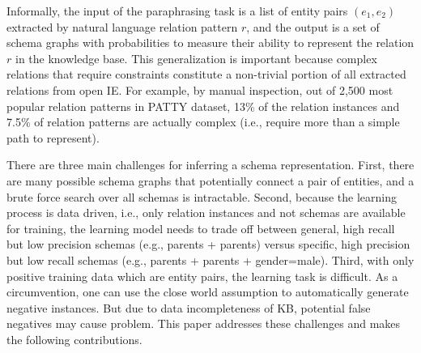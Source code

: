 Informally, the input of the paraphrasing task is a list of entity pairs
$(e_1, e_2)$ extracted by natural language relation pattern $r$,
and the output is a set of schema graphs with probabilities to measure
their ability to represent the relation $r$ in the knowledge base.
This generalization is important because complex relations that
require constraints constitute a non-trivial portion of all extracted
relations from open IE.
For example, by manual inspection, out of 2,500 most popular 
relation patterns in PATTY dataset,  13\% of the relation
instances and 7.5\%  of relation patterns
are actually complex (i.e., require more than a simple path to represent).

There are three main challenges for inferring a schema representation.
First, there are many possible schema graphs that potentially
connect a pair of entities, and a brute force search over all schemas
is intractable.
Second, because the learning process is data driven, i.e.,
only relation instances and not schemas are available for training,
the learning model needs to trade off between general, high recall but
low precision schemas (e.g., parents + parents) versus specific, high
precision but low recall schemas (e.g., parents + parents + gender=male).
Third, with only positive training data which are entity pairs, 
the learning task is difficult.
As a circumvention, one can use the close world assumption to automatically
generate negative instances. But due to data incompleteness of KB,
potential false negatives may cause problem.
This paper addresses these challenges and makes the following contributions.

%

